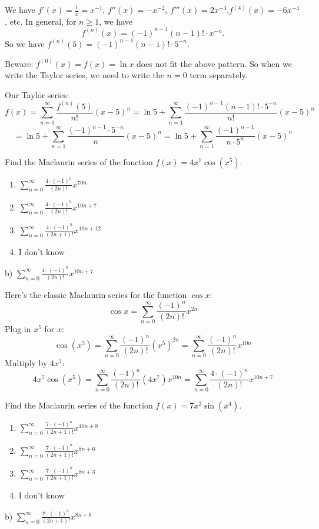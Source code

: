 \documentclass[addpoints,12pt,answers]{exam}
\begin{document}
\begin{questions}
\begin{solution}
    We have $f'(x)=\frac{1}{x}=x^{-1}$, $f''(x)=-x^{-2}$, $f'''(x)=2x^{-3}$,\newline $f^{(4)}(x)=-6x^{-4}$, etc. In general, for $n\ge 1$, we have $$f^{(n)}(x)=(-1)^{n-1}(n-1)!\cdot x^{-n}.$$ So we have $f^{(n)}(5)=(-1)^{n-1}(n-1)!\cdot 5^{-n}$.
      
    Beware: $f^{(0)}(x)=f(x)=\ln x$ does not fit the above pattern. So when we write the Taylor series, we need to write the $n=0$ term separately.
      
    Our Taylor series:
    $$f(x)=\sum_{n=0}^\infty\frac{f^{(n)}(5)}{n!}(x-5)^n=\ln 5+\sum_{n=1}^\infty\frac{(-1)^{n-1}(n-1)!\cdot 5^{-n}}{n!}(x-5)^n$$
    $$=\ln 5+\sum_{n=1}^\infty\frac{(-1)^{n-1}\cdot 5^{-n}}{n}(x-5)^n=\ln 5+\sum_{n=1}^\infty\frac{(-1)^{n-1}}{n\cdot 5^n}(x-5)^n$$
  \end{solution}
  \newpage
  \question
  Find the Maclaurin series of the function $f(x)=4x^7\cos(x^5)$.
  \begin{enumerate}[label=\alph*)]
    \item
    $\displaystyle\sum_{n=0}^\infty\frac{4\cdot(-1)^n}{(2n)!}x^{70n}$
    \item
    $\displaystyle\sum_{n=0}^\infty\frac{4\cdot(-1)^n}{(2n)!}x^{10n+7}$
    \item
    $\displaystyle\sum_{n=0}^\infty\frac{4\cdot(-1)^n}{(2n+1)!}x^{10n+12}$
    \item
    I don't know
  \end{enumerate}
  \begin{solution}
    b) $\displaystyle\sum_{n=0}^\infty\frac{4\cdot(-1)^n}{(2n)!}x^{10n+7}$
    
    Here's the classic Maclaurin series for the function $\cos x$:
    $$\cos x=\sum_{n=0}^\infty\frac{(-1)^n}{(2n)!}x^{2n}$$
    Plug in $x^5$ for $x$:
    $$\cos(x^5)=\sum_{n=0}^\infty\frac{(-1)^n}{(2n)!}(x^5)^{2n}=\sum_{n=0}^\infty\frac{(-1)^n}{(2n)!}x^{10n}$$
    Multiply by $4x^7$:
    $$4x^7\cos(x^5)=\sum_{n=0}^\infty\frac{(-1)^n}{(2n)!}(4x^7)x^{10n}=\sum_{n=0}^\infty\frac{4\cdot(-1)^n}{(2n)!}x^{10n+7}$$
  \end{solution}
  \newpage
  \question
  Find the Maclaurin series of the function $f(x)=7x^2\sin(x^4)$.
  \begin{enumerate}[label=\alph*)]
    \item
    $\displaystyle\sum_{n=0}^\infty\frac{7\cdot(-1)^n}{(2n+1)!}x^{16n+8}$
    \item
    $\displaystyle\sum_{n=0}^\infty\frac{7\cdot(-1)^n}{(2n+1)!}x^{8n+6}$
    \item
    $\displaystyle\sum_{n=0}^\infty\frac{7\cdot(-1)^n}{(2n+1)!}x^{8n+3}$
    \item
    I don't know
  \end{enumerate}
  \begin{solution}
    b) $\displaystyle\sum_{n=0}^\infty\frac{7\cdot(-1)^n}{(2n+1)!}x^{8n+6}$
    

\end{solution}
\end{questions}
\end{document}

